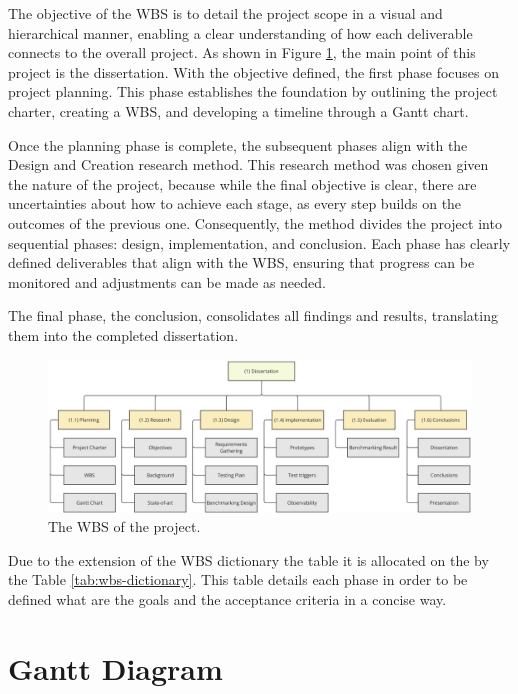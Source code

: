 The objective of the \gls{WBS} is to detail the project scope in a visual and hierarchical manner, enabling a clear understanding of how each deliverable connects to the overall project.
As shown in Figure \ref{fig:wbs}, the main point of this project is the dissertation. With the objective defined, the first phase focuses on project planning. This phase establishes the foundation by outlining the project charter, creating a \gls{WBS}, and developing a timeline through a Gantt chart.

Once the planning phase is complete, the subsequent phases align with the Design and Creation research method. This research method was chosen given the nature of the project, because while the final objective is clear, there are uncertainties about how to achieve each stage, as every step builds on the outcomes of the previous one. Consequently, the method divides the project into sequential phases: design, implementation, and conclusion. Each phase has clearly defined deliverables that align with the \gls{WBS}, ensuring that progress can be monitored and adjustments can be made as needed.

The final phase, the conclusion, consolidates all findings and results, translating them into the completed dissertation.

\begin{figure}
      \centering
      \includegraphics[width=\linewidth]{ch-planning/assets/wbs.png}
      \caption{The WBS of the project.}
      \label{fig:wbs}
\end{figure}

Due to the extension of the \gls{WBS} dictionary the table it is allocated on the  by the Table \ref{tab:wbs-dictionary}. This table details each phase in order to be defined what are the goals and the acceptance criteria in a concise way. 

\section{Gantt Diagram}

